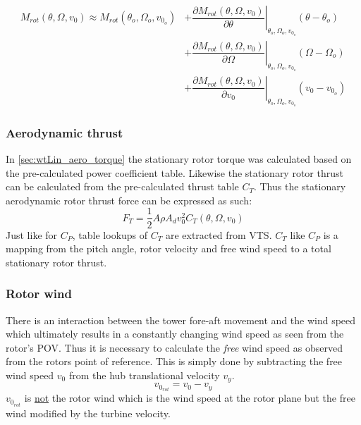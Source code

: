 \begin{align}
	M_{rot}(\theta, \Omega, v_0) \approx M_{rot}(\theta_o, \Omega_o, v_{0_o}) 
	& + \left. \dfrac{\partial M_{rot}(\theta, \Omega, v_0)}{\partial \theta} \right |_{\theta_o, \Omega_o, v_{0_o}} ( \theta-\theta_o) \\
	& + \left. \dfrac{\partial M_{rot}(\theta, \Omega, v_0)}{\partial \Omega} \right |_{\theta_o, \Omega_o, v_{0_o}} ( \Omega-\Omega_o) \\
	& + \left. \dfrac{\partial M_{rot}(\theta, \Omega, v_0)}{\partial v_0} \right |_{\theta_o, \Omega_o, v_{0_o}} ( v_0 - v_{0_o})
\end{align}


\subsubsection{Aerodynamic thrust} \label{sec:wtLin_aero_thrust}
In \cref{sec:wtLin_aero_torque} the stationary rotor torque was calculated based on the pre-calculated power coefficient table. Likewise the stationary rotor thrust can be calculated from the pre-calculated thrust table $ C_T $. Thus the stationary aerodynamic rotor thrust force can be expressed as such:
\begin{equation} \label{eq:wtLin_aero_thrust}
	F_T = \dfrac{1}{2} A \rho A_d v_0^2 C_T(\theta, \Omega, v_0)
\end{equation}
Just like for $ C_P $, table lookups of $ C_T $ are extracted from VTS. $ C_T $ like $ C_P $ is a mapping from the pitch angle, rotor velocity and free wind speed to a total stationary rotor thrust.


\subsubsection{Rotor wind}
There is an interaction between the tower fore-aft movement and the wind speed which ultimately results in a constantly changing wind speed as seen from the rotor's POV. Thus it is necessary to calculate the \textit{free} wind speed as observed from the rotors point of reference. This is simply done by subtracting the free wind speed $ v_0 $ from the hub translational velocity $ v_y $.
\begin{equation}\label{eq:wtlin_comp_rotorwind}
	v_{0_{rot}} = v_{0} - v_y
\end{equation}
$ v_{0_{rot}} $ is \underline{not} the rotor wind which is the wind speed at the rotor plane but the free wind modified by the turbine velocity.


